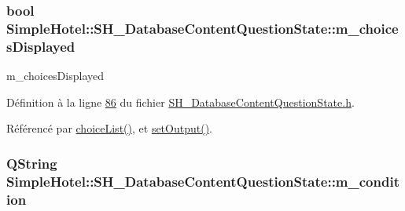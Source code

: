 \hypertarget{classSimpleHotel_1_1SH__DatabaseContentQuestionState_acb045bff3966840e9266b39430f38144}{
\subsubsection[{m\-\_\-choices\-Displayed}]{\setlength{\rightskip}{0pt plus 5cm}bool Simple\-Hotel\-::\-S\-H\-\_\-\-Database\-Content\-Question\-State\-::m\-\_\-choices\-Displayed\hspace{0.3cm}{\ttfamily [private]}}}\label{classSimpleHotel_1_1SH__DatabaseContentQuestionState_acb045bff3966840e9266b39430f38144}


m\-\_\-choices\-Displayed 



Définition à la ligne \hyperlink{SH__DatabaseContentQuestionState_8h_source_l00086}{86} du fichier \hyperlink{SH__DatabaseContentQuestionState_8h_source}{S\-H\-\_\-\-Database\-Content\-Question\-State.\-h}.



Référencé par \hyperlink{classSimpleHotel_1_1SH__DatabaseContentQuestionState_a86e7bfe0585fc6c63fef4db80247221e}{choice\-List()}, et \hyperlink{classSimpleHotel_1_1SH__DatabaseContentQuestionState_ab85498797a0318417580ad3f274b018a}{set\-Output()}.

\hypertarget{classSimpleHotel_1_1SH__DatabaseContentQuestionState_af58df736e856e78ef4689714a75b756c}{
\subsubsection[{m\-\_\-condition}]{\setlength{\rightskip}{0pt plus 5cm}Q\-String Simple\-Hotel\-::\-S\-H\-\_\-\-Database\-Content\-Question\-State\-::m\-\_\-condition\hspace{0.3cm}{\ttfamily [private]}}}\label{classSimpleHotel_1_1SH__DatabaseContentQuestionState_af58df736e856e78ef4689714a75b756c}


